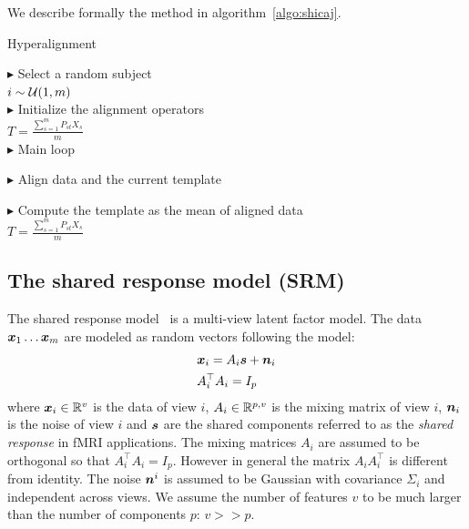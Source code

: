 We describe formally
the method in algorithm~\ref{algo:shicaj}.

\begin{algorithm}[H]
  \SetAlgoLined
  \caption{Hyperalignment}
  \label{algo:shicaj}
  $\blacktriangleright$ Select a random subject \\
  $i \sim \mathcal{U}(1, m)$ \\
  $\blacktriangleright$ Initialize the alignment operators \\
  $T = \frac{\sum_{s=1}^m P_{st} X_s}{m}$ \\

  $\blacktriangleright$ Main loop \\
  {
    $\blacktriangleright$ Align data and the current template \\

    $\blacktriangleright$ Compute the template as the mean of aligned data \\
    $T = \frac{\sum_{s=1}^m P_{st} X_s}{m}$ \\
    }
\end{algorithm}



\subsection{The shared response model (SRM)}
The shared response model~\cite{chen2015reduced} is a multi-view latent factor
model. The data $\boldsymbol{x}_1 \dots \boldsymbol{x}_m$ are modeled as random vectors following the model:
\begin{align}
 &\boldsymbol{x}_i = A_i \boldsymbol{s} + \boldsymbol{n}_i \\
  &A_i^{\top}A_i = I_p
  \label{eq:model:srm}
\end{align}
where $\boldsymbol{x}_i \in \mathbb{R}^v$ is the data of view $i$, $A_i \in \mathbb{R}^{p, v}$ is the
mixing matrix of view $i$, $\boldsymbol{n}_i$ is the noise of view $i$ and $\boldsymbol{s}$ are the
shared components referred to as the \emph{shared response} in fMRI applications.
The mixing matrices
$A_i$ are assumed to be orthogonal so that $A_i^{\top}A_i = I_p$. However in
general the matrix $A_i A_i^{\top}$ is different from identity. The noise
$\boldsymbol{n}^i$ is assumed to be Gaussian with covariance $\Sigma_i$ and independent
across views. We assume the number of features $v$ to be much larger than the
number of components $p$: $v >> p$.

